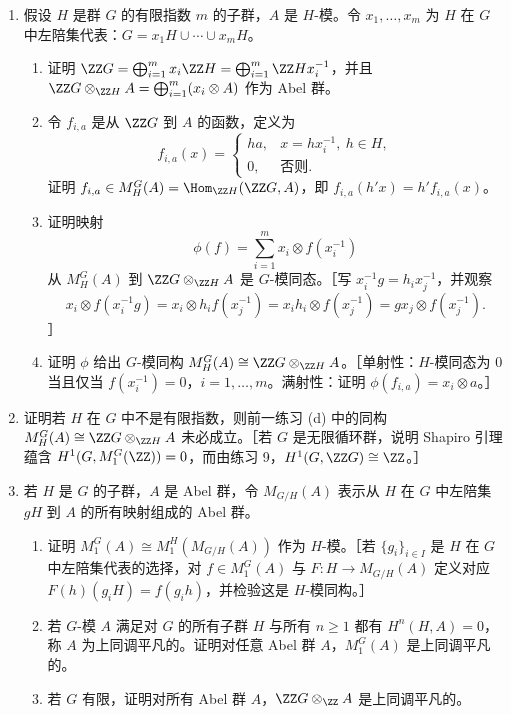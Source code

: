 \begin{enumerate}[label=\arabic*.]
  \item 假设 $H$ 是群 $G$ 的有限指数 $m$ 的子群，$A$ 是 $H$-模。令 $x_1,
  \ldots,x_m$ 为 $H$ 在 $G$ 中左陪集代表：$G=x_1H\cup\cdots\cup x_mH$。
  \begin{enumerate}[label=(\alph*)]
    \item 证明 $\ZZ G=\bigoplus_{i=1}^m x_i\ZZ H=\bigoplus_{i=1}^m\ZZ Hx_i^{-1}$，并且 $\ZZ G\otimes_{\ZZ H}A=\bigoplus_{i=1}^m(x_i\otimes A)$ 作为 Abel 群。
    \item 令 $f_{i,a}$ 是从 $\ZZ G$ 到 $A$ 的函数，定义为
    \[
      f_{i,a}(x)=
      \begin{cases}
      ha,& x=hx_i^{-1},\ h\in H,\\
      0,& \text{否则}.
      \end{cases}
    \]
    证明 $f_{i,a}\in M_H^G(A)=\Hom_{\ZZ H}(\ZZ G,A)$，即 $f_{i,a}(h'x)=h'f_{i,a}(x)$。
    \item 证明映射
    \[
      \phi(f)=\sum_{i=1}^m x_i\otimes f(x_i^{-1})
    \]
    从 $M_H^G(A)$ 到 $\ZZ G\otimes_{\ZZ H}A$ 是 $G$-模同态。［写 $x_i^{-1}g=h_ix_j^{-1}$，并观察
    \[
      x_i\otimes f(x_i^{-1}g)=x_i\otimes h_if(x_j^{-1})=x_ih_i\otimes f(x_j^{-1})=gx_j\otimes f(x_j^{-1}).
    \]
    ］
    \item 证明 $\phi$ 给出 $G$-模同构 $M_H^G(A)\cong\ZZ G\otimes_{\ZZ H}A$。［单射性：$H$-模同态为 $0$ 当且仅当 $f(x_i^{-1})=0$，$i=1,
    \ldots,m$。满射性：证明 $\phi(f_{i,a})=x_i\otimes a$。］
  \end{enumerate}

  \item 证明若 $H$ 在 $G$ 中不是有限指数，则前一练习 (d) 中的同构 $M_H^G(A)\cong\ZZ G\otimes_{\ZZ H}A$ 未必成立。［若 $G$ 是无限循环群，说明 Shapiro 引理蕴含 $H^1(G,M_1^G(\ZZ))=0$，而由练习 9，$H^1(G,\ZZ G)\cong\ZZ$。］

  \item 若 $H$ 是 $G$ 的子群，$A$ 是 Abel 群，令 $M_{G/H}(A)$ 表示从 $H$ 在 $G$ 中左陪集 $gH$ 到 $A$ 的所有映射组成的 Abel 群。
  \begin{enumerate}[label=(\alph*)]
    \item 证明 $M_1^G(A)\cong M_1^H(M_{G/H}(A))$ 作为 $H$-模。［若 $\{g_i\}_{i\in I}$ 是 $H$ 在 $G$ 中左陪集代表的选择，对 $f\in M_1^G(A)$ 与 $F:H\to M_{G/H}(A)$ 定义对应 $F(h)(g_iH)=f(g_ih)$，并检验这是 $H$-模同构。］
    \item 若 $G$-模 $A$ 满足对 $G$ 的所有子群 $H$ 与所有 $n\geq1$ 都有 $H^n(H,A)=0$，称 $A$ 为上同调平凡的。证明对任意 Abel 群 $A$，$M_1^G(A)$ 是上同调平凡的。
    \item 若 $G$ 有限，证明对所有 Abel 群 $A$，$\ZZ G\otimes_{\ZZ}A$ 是上同调平凡的。
  \end{enumerate}


\end{enumerate}
